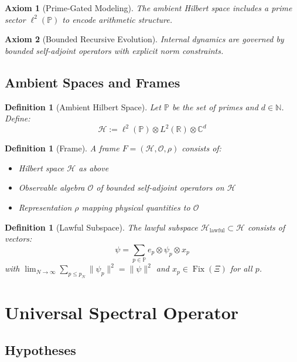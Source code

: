 \documentclass[10pt]{article}
\newtheorem{axiom}{Axiom}
\newtheorem{definition}[theorem]{Definition}
\DeclareMathOperator{\Fix}{Fix}
\newcommand{\PP}{\mathbb{P}}
\newcommand{\RR}{\mathbb{R}}
\newcommand{\CC}{\mathbb{C}}
\newcommand{\HH}{\mathcal{H}}
\begin{document}
\begin{axiom}[Prime-Gated Modeling]
The ambient Hilbert space includes a prime sector $\ell^2(\mathbb{P})$ to encode arithmetic structure.
\end{axiom}

\begin{axiom}[Bounded Recursive Evolution]
Internal dynamics are governed by bounded self-adjoint operators with explicit norm constraints.
\end{axiom}

\subsection{Ambient Spaces and Frames}

\begin{definition}[Ambient Hilbert Space]
Let $\PP$ be the set of primes and $d \in \mathbb{N}$. Define:
\[
\HH := \ell^2(\PP) \otimes L^2(\RR) \otimes \CC^d
\]
\end{definition}

\begin{definition}[Frame]
A \emph{frame} $F = (\HH, \mathcal{O}, \rho)$ consists of:
\begin{itemize}
    \item Hilbert space $\HH$ as above
    \item Observable algebra $\mathcal{O}$ of bounded self-adjoint operators on $\HH$  
    \item Representation $\rho$ mapping physical quantities to $\mathcal{O}$
\end{itemize}
\end{definition}

\begin{definition}[Lawful Subspace]
The lawful subspace $\HH_{\text{lawful}} \subset \HH$ consists of vectors:
\[
\psi = \sum_{p \in \PP} e_p \otimes \psi_p \otimes x_p
\]
with $\lim_{N\to\infty} \sum_{p \leq p_N} \|\psi_p\|^2 = \|\psi\|^2$ and $x_p \in \Fix(\Xi)$ for all $p$.
\end{definition}

\section{Universal Spectral Operator}

\subsection{Hypotheses}
\end{document}
